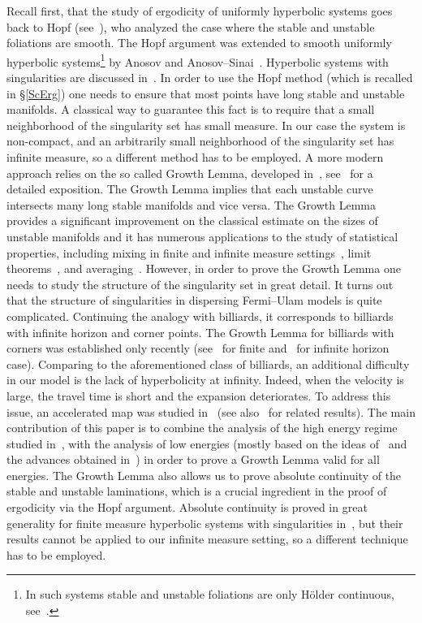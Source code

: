 \documentclass[10pt]{amsart}
\theoremstyle{definition}\newtheorem{defi}[theo]{Definition}\newtheorem{rema}[theo]{Remark}\newtheorem{exam}[theo]{Example}\newtheorem{exem}[theo]{Example}\newtheorem{nota}[theo]{Notation}
\begin{document}
Recall first, that the study of ergodicity of uniformly hyperbolic systems goes back to Hopf (see~\cite{Hopf}), who analyzed the case where the stable and unstable foliations are smooth. The Hopf argument was extended to smooth uniformly hyperbolic systems\footnote{In such systems stable and unstable foliations are only H\"older continuous, see~\cite{Anosov}.} by Anosov and Anosov--Sinai~\cite{Anosov, AS}. Hyperbolic systems with singularities are discussed in~\cite{SC, KatStr, LW,Pesin,Sinai}. In order to use the Hopf method (which is recalled in \S\ref{ScErg}) one needs to ensure that most points have long stable and unstable manifolds. A classical way to guarantee this fact is to require that a small neighborhood of the singularity set has small measure. In our case the system is non-compact, and an arbitrarily small neighborhood of the singularity set has infinite measure, so a different method has to be employed. A more modern approach relies on the so called Growth Lemma, developed in~\cite{BSC}, see~\cite{ChM} for a detailed exposition. The Growth Lemma implies that each unstable curve intersects many long stable manifolds and vice versa. The Growth Lemma provides a significant improvement on the classical estimate on the sizes of unstable manifolds and it has numerous applications to the study of statistical properties, including mixing in finite and infinite measure settings~\cite{C2, C3, ChZ, DN-Mech}, limit theorems~\cite{C4, DSV}, and averaging~\cite{CD1, CD2, DN-Tube}. However, in order to prove the Growth Lemma one needs to study the structure of the singularity set in great detail. It turns out that the structure of singularities in dispersing Fermi--Ulam models is quite complicated. Continuing the analogy with billiards, it corresponds to billiards with infinite horizon and corner points. The Growth Lemma for billiards with corners was established only recently (see~\cite{jmogy} for finite and~\cite{BrownNandori} for infinite horizon case). Comparing to the aforementioned class of billiards, an additional difficulty in our model is the lack of hyperbolicity at infinity. Indeed, when the velocity is large, the travel time is short and the expansion deteriorates. To address this issue, an accelerated map was studied in~\cite{fum} (see also~\cite{DF, D-icmp} for related results). The main contribution of this paper is to combine the analysis of the high energy regime studied in~\cite{fum}, with the analysis of low energies (mostly based on the ideas of~\cite{ChM} and the advances obtained in~\cite{jmogy}) in order to prove a Growth Lemma valid for all energies. The Growth Lemma also allows us to prove absolute continuity of the stable and unstable laminations, which is a crucial ingredient in the proof of ergodicity via the Hopf argument. Absolute continuity is proved in great generality for finite measure hyperbolic systems with singularities in~\cite{KatStr}, but their results cannot be applied to our infinite measure setting, so a different technique has to be employed.
\end{document}

